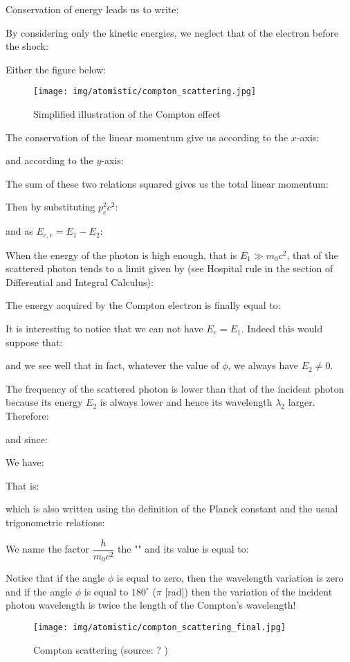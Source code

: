 	Conservation of energy leads us to write:
	
	By considering only the kinetic energies, we neglect that of the electron before the shock:
	
	Either the figure below:
	\begin{figure}[H]
		\centering
		\texttt{[image: img/atomistic/compton\_scattering.jpg]}
		\caption[]{Simplified illustration of the Compton effect}
	\end{figure}
	The conservation of the linear momentum give us according to the $x$-axis:
	
	and according to the $y$-axis:
	
	The sum of these two relations squared gives us the total linear momentum:
	
	Then by substituting $p_e^2c^2$:
	
	and as $E_{c,e}=E_1-E_2$:
	
	When the energy of the photon is high enough, that is $E_1\gg m_0c^2$, that of the scattered photon tends to a limit given by (see Hospital rule in the section of Differential and Integral Calculus):
	
	The energy acquired by the Compton electron is finally equal to:
	
	It is interesting to notice that we can not have $E_e=E_1$. Indeed this would suppose that:
	
	and we see well that in fact, whatever the value of $\phi$, we always have $E_2\neq 0$.
	
	The frequency of the scattered photon is lower than that of the incident photon because its energy $E_2$ is always lower and hence its wavelength $\lambda_2$ larger. Therefore:
	
	and since:
	
	We have:
	
	That is:
	
	which is also written using the definition of the Planck constant and the usual trigonometric relations:
	
	We name the factor $\dfrac{h}{m_0c^2}$ the "\label{compton wavelength}" and its value is equal to:
	
	Notice that if the angle $\phi$ is equal to zero, then the wavelength variation is zero and if the angle $\phi$ is equal to $180^\circ$ ($\pi$ [rad]) then the variation of the incident photon wavelength is twice the length of the Compton's wavelength!
	
	\begin{figure}[H]
		\centering
		\texttt{[image: img/atomistic/compton\_scattering\_final.jpg]}
		\caption[Compton scattering]{Compton scattering (source: ? )}
	\end{figure}
	
